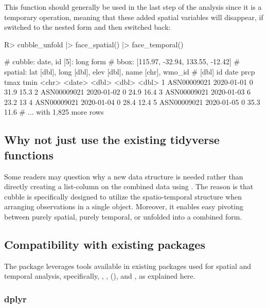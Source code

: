 \documentclass[
]{jss}
\begin{document}
This function should generally be used in the last step of the analysis since it is a temporary operation, meaning that these added spatial variables will disappear, if switched to the nested form and then switched back:

\begin{CodeChunk}
\begin{CodeInput}
R> cubble_unfold |> face_spatial() |> face_temporal()
\end{CodeInput}
\begin{CodeOutput}
# cubble:  date, id [5]: long form
# bbox:    [115.97, -32.94, 133.55, -12.42]
# spatial: lat [dbl], long [dbl], elev [dbl], name [chr], wmo_id
#   [dbl]
  id          date        prcp  tmax  tmin
  <chr>       <date>     <dbl> <dbl> <dbl>
1 ASN00009021 2020-01-01     0  31.9  15.3
2 ASN00009021 2020-01-02     0  24.9  16.4
3 ASN00009021 2020-01-03     6  23.2  13  
4 ASN00009021 2020-01-04     0  28.4  12.4
5 ASN00009021 2020-01-05     0  35.3  11.6
# ... with 1,825 more rows
\end{CodeOutput}
\end{CodeChunk}

\hypertarget{tidyverse}{%
\subsection{Why not just use the existing tidyverse functions}\label{tidyverse}}

Some readers may question why a new data structure is needed rather than directly creating a list-column on the combined data using . The reason is that cubble is specifically designed to utilize the spatio-temporal structure when arranging observations in a single object. Moreover, it enables easy pivoting between purely spatial, purely temporal, or unfolded into a combined form.

\hypertarget{compact}{%
\subsection{Compatibility with existing packages}\label{compact}}

The  package leverages tools available in existing packages used for spatial and temporal analysis, specifically, , ,  (), and , as explained here.

\hypertarget{dplyr}{%
\subsubsection{dplyr}\label{dplyr}}
\end{document}
